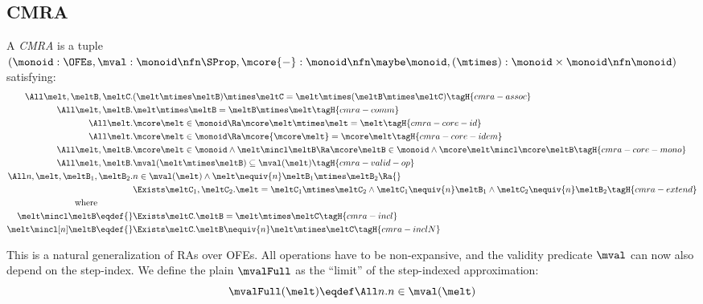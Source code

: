 \subsection{CMRA}

\begin{defn}
  A \emph{CMRA} is a tuple $(\monoid : \OFEs, \mval : \monoid \nfn \SProp, \mcore{{-}}: \monoid \nfn \maybe\monoid,\\ (\mtimes) : \monoid \times \monoid \nfn \monoid)$ satisfying:
  \begin{align*}
    \All \melt, \meltB, \meltC.& (\melt \mtimes \meltB) \mtimes \meltC = \melt \mtimes (\meltB \mtimes \meltC) \tagH{cmra-assoc} \\
    \All \melt, \meltB.& \melt \mtimes \meltB = \meltB \mtimes \melt \tagH{cmra-comm} \\
    \All \melt.& \mcore\melt \in \monoid \Ra \mcore\melt \mtimes \melt = \melt \tagH{cmra-core-id} \\
    \All \melt.& \mcore\melt \in \monoid \Ra \mcore{\mcore\melt} = \mcore\melt \tagH{cmra-core-idem} \\
    \All \melt, \meltB.& \mcore\melt \in \monoid \land \melt \mincl \meltB \Ra \mcore\meltB \in \monoid \land \mcore\melt \mincl \mcore\meltB \tagH{cmra-core-mono} \\
    \All \melt, \meltB.& \mval(\melt \mtimes \meltB) \subseteq \mval(\melt)  \tagH{cmra-valid-op} \\
    \All n, \melt, \meltB_1, \meltB_2.& \omit\rlap{$n \in \mval(\melt) \land \melt \nequiv{n} \meltB_1 \mtimes \meltB_2 \Ra {}$} \\
    &\Exists \meltC_1, \meltC_2. \melt = \meltC_1 \mtimes \meltC_2 \land \meltC_1 \nequiv{n} \meltB_1 \land \meltC_2 \nequiv{n} \meltB_2 \tagH{cmra-extend} \\
    \text{where}\qquad\qquad\\
    \melt \mincl \meltB \eqdef{}& \Exists \meltC. \meltB = \melt \mtimes \meltC \tagH{cmra-incl} \\
    \melt \mincl[n] \meltB \eqdef{}& \Exists \meltC. \meltB \nequiv{n} \melt \mtimes \meltC \tagH{cmra-inclN}
  \end{align*}
\end{defn}

This is a natural generalization of RAs over OFEs.
All operations have to be non-expansive, and the validity predicate $\mval$ can now also depend on the step-index.
We define the plain $\mvalFull$ as the ``limit'' of the step-indexed approximation:
\[ \mvalFull(\melt) \eqdef \All n. n \in \mval(\melt) \]

